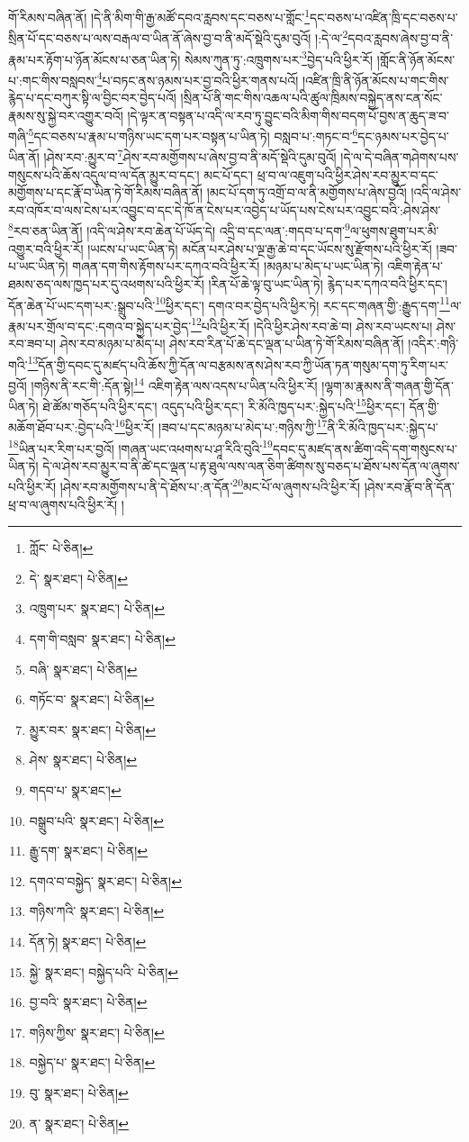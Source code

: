 གོ་རིམས་བཞིན་ནོ། །དེ་ནི་མིག་གི་རྒྱ་མཚོ་དབའ་རླབས་དང་བཅས་པ་གློང་\footnote{ཀློང་  པེ་ཅིན། }དང་བཅས་པ་འཛིན་ཁྲི་དང་བཅས་པ་སྲིན་པོ་དང་བཅས་པ་ལས་བརྒལ་བ་ཡིན་ནོ་ཞེས་བྱ་བ་ནི་མདོ་སྡེའི་དུམ་བུའོ། །:དེ་ལ་\footnote{དེ་  སྣར་ཐང་།  པེ་ཅིན། }དབའ་རླབས་ཞེས་བྱ་བ་ནི་རྣམ་པར་རྟོག་པ་ཉོན་མོངས་པ་ཅན་ཡིན་ཏེ། སེམས་ཀུན་ཏུ་:འཁྲུགས་པར་\footnote{འཁྲུག་པར་  སྣར་ཐང་།  པེ་ཅིན། }བྱེད་པའི་ཕྱིར་རོ། །གློང་ནི་ཉོན་མོངས་པ་:གང་གིས་བསླབས་\footnote{དག་གི་བསླབ་  སྣར་ཐང་།  པེ་ཅིན། }པ་བཏང་ནས་ཉམས་པར་བྱ་བའི་ཕྱིར་གནས་པའོ། །འཛིན་ཁྲི་ནི་ཉོན་མོངས་པ་གང་གིས་རྙེད་པ་དང་བཀུར་སྟི་ལ་བྱིང་བར་བྱེད་པའོ། །སྲིན་པོ་ནི་གང་གིས་འཆལ་པའི་ཚུལ་ཁྲིམས་བསྐྱེད་ནས་ངན་སོང་རྣམས་སུ་སྐྱེ་བར་འགྱུར་བའོ། །དེ་ལྟར་ན་བསྟན་པ་འདི་ལ་རབ་ཏུ་བྱུང་བའི་མིག་གིས་བདག་པོ་བྱས་ན་ཆུད་ཟ་བ་གཞི་\footnote{བཞི་  སྣར་ཐང་།  པེ་ཅིན། }དང་བཅས་པ་རྣམ་པ་གཉིས་ཡང་དག་པར་བསྟན་པ་ཡིན་ཏེ། བསླབ་པ་:གཏང་བ་\footnote{གཏོང་བ་  སྣར་ཐང་།  པེ་ཅིན། }དང་ཉམས་པར་བྱེད་པ་ཡིན་ནོ། །ཤེས་རབ་:མྱུར་བ་\footnote{མྱུར་བར་  སྣར་ཐང་།  པེ་ཅིན། }ཤེས་རབ་མགྱོགས་པ་ཞེས་བྱ་བ་ནི་མདོ་སྡེའི་དུམ་བུའོ། །དེ་ལ་དེ་བཞིན་གཤེགས་པས་གསུངས་པའི་ཆོས་འདུལ་བ་ལ་དོན་མྱུར་བ་དང་། མང་པོ་དང་། ཕྲ་བ་ལ་འཇུག་པའི་ཕྱིར་ཤེས་རབ་མྱུར་བ་དང་མགྱོགས་པ་དང་རྣོ་བ་ཡིན་ཏེ་གོ་རིམས་བཞིན་ནོ། །མང་པོ་དག་ཏུ་འགྲོ་བ་ལ་ནི་མགྱོགས་པ་ཞེས་བྱའོ། །འདི་ལ་ཤེས་རབ་འཁོར་བ་ལས་ངེས་པར་འབྱུང་བ་དང་དེ་ཁོ་ན་ངེས་པར་འབྱེད་པ་ཡོད་པས་ངེས་པར་འབྱུང་བའི་:ཤེས་ཤེས་\footnote{ཤེས་  སྣར་ཐང་།  པེ་ཅིན། }རབ་ཅན་ཡིན་ནོ། །འདི་ལ་ཤེས་རབ་ཆེན་པོ་ཡོད་དེ། འདྲི་བ་དང་ལན་:གདབ་པ་དག་\footnote{གདབ་པ་  སྣར་ཐང་། }ལ་ཕུགས་ཐུག་པར་མི་འགྱུར་བའི་ཕྱིར་རོ། །ཡངས་པ་ཡང་ཡིན་ཏེ། མངོན་པར་ཤེས་པ་ལྔ་རྒྱ་ཆེ་བ་དང་ཡོངས་སུ་རྫོགས་པའི་ཕྱིར་རོ། །ཟབ་པ་ཡང་ཡིན་ཏེ། གཞན་དག་གིས་རྟོགས་པར་དཀའ་བའི་ཕྱིར་རོ། །མཉམ་པ་མེད་པ་ཡང་ཡིན་ཏེ། འཇིག་རྟེན་པ་ཐམས་ཅད་ལས་ཁྱད་པར་དུ་འཕགས་པའི་ཕྱིར་རོ། །རིན་པོ་ཆེ་ལྟ་བུ་ཡང་ཡིན་ཏེ། རྙེད་པར་དཀའ་བའི་ཕྱིར་དང་། དོན་ཆེན་པོ་ཡང་དག་པར་:སྒྲུབ་པའི་\footnote{བསྒྲུབ་པའི་  སྣར་ཐང་།  པེ་ཅིན། }ཕྱིར་དང་། དགའ་བར་བྱེད་པའི་ཕྱིར་ཏེ། རང་དང་གཞན་གྱི་:རྒྱུད་དག་\footnote{རྒྱུ་དག་  སྣར་ཐང་།  པེ་ཅིན། }ལ་རྣམ་པར་གྲོལ་བ་དང་:དགའ་བ་སྐྱེད་པར་བྱེད་\footnote{དགའ་བ་བསྐྱེད་  སྣར་ཐང་།  པེ་ཅིན། }པའི་ཕྱིར་རོ། །དེའི་ཕྱིར་ཤེས་རབ་ཆེ་བ། ཤེས་རབ་ཡངས་པ། ཤེས་རབ་ཟབ་པ། ཤེས་རབ་མཉམ་པ་མེད་པ། ཤེས་རབ་རིན་པོ་ཆེ་དང་ལྡན་པ་ཡིན་ཏེ་གོ་རིམས་བཞིན་ནོ། །འདིར་:གཉི་གའི་\footnote{གཉིས་ཀའི་  སྣར་ཐང་།  པེ་ཅིན། }དོན་གྱི་དབང་དུ་མཛད་པའི་ཆོས་ཀྱི་དོན་ལ་བརྩམས་ནས་ཤེས་རབ་ཀྱི་ཡོན་ཏན་གསུམ་དག་ཏུ་རིག་པར་བྱའོ། །གཉིས་ནི་རང་གི་:དོན་སྟེ།\footnote{དོན་ཏེ།  སྣར་ཐང་།  པེ་ཅིན། } འཇིག་རྟེན་ལས་འདས་པ་ཡིན་པའི་ཕྱིར་རོ། །ལྷག་མ་རྣམས་ནི་གཞན་གྱི་དོན་ཡིན་ཏེ། ཐེ་ཚོམ་གཅོད་པའི་ཕྱིར་དང་། འདུད་པའི་ཕྱིར་དང་། རི་མོའི་ཁྱད་པར་:སྐྱེད་པའི་\footnote{སྐྱེ་  སྣར་ཐང་། བསྐྱེད་པའི་  པེ་ཅིན། }ཕྱིར་དང་། དོན་གྱི་མཆོག་ཐོབ་པར་:བྱེད་པའི་\footnote{བྱ་བའི་  སྣར་ཐང་།  པེ་ཅིན། }ཕྱིར་རོ། །ཟབ་པ་དང་མཉམ་པ་མེད་པ་:གཉིས་ཀྱི་\footnote{གཉིས་ཀྱིས་  སྣར་ཐང་།  པེ་ཅིན། }ནི་རི་མོའི་ཁྱད་པར་:སྐྱེད་པ་\footnote{བསྐྱེད་པ་  སྣར་ཐང་།  པེ་ཅིན། }ཡིན་པར་རིག་པར་བྱའོ། །གཞན་ཡང་འཕགས་པ་ཤཱ་རིའི་བུའི་\footnote{བུ་  སྣར་ཐང་།  པེ་ཅིན། }དབང་དུ་མཛད་ནས་ཚིག་འདི་དག་གསུངས་པ་ཡིན་ཏེ། དེ་ལ་ཤེས་རབ་མྱུར་བ་ནི་ཚེ་དང་ལྡན་པ་རྟ་ཐུལ་ལས་ལན་ཅིག་ཚིགས་སུ་བཅད་པ་ཐོས་པས་དོན་ལ་ཞུགས་པའི་ཕྱིར་རོ། །ཤེས་རབ་མགྱོགས་པ་ནི་དེ་ཐོས་པ་:ན་དོན་\footnote{ན་  སྣར་ཐང་།  པེ་ཅིན། }མང་པོ་ལ་ཞུགས་པའི་ཕྱིར་རོ། །ཤེས་རབ་རྣོ་བ་ནི་དོན་ཕྲ་བ་ལ་ཞུགས་པའི་ཕྱིར་རོ། །
